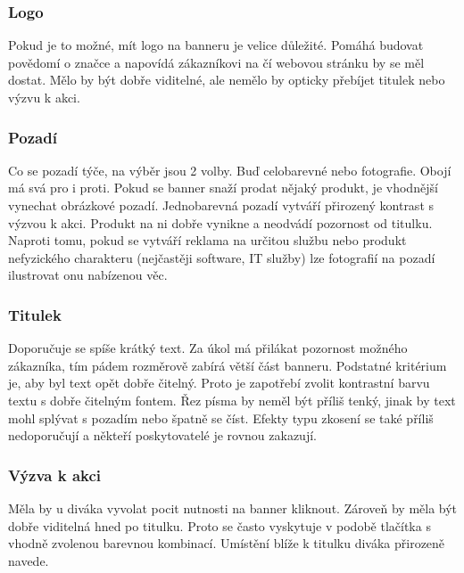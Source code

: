     \subsubsection{Logo}
    Pokud je to možné, mít logo na banneru je velice důležité. Pomáhá budovat povědomí o značce a napovídá zákazníkovi na čí webovou stránku by se měl dostat.
    Mělo by být dobře viditelné, ale nemělo by opticky přebíjet titulek nebo výzvu k akci.

    \subsubsection{Pozadí}
    Co se pozadí týče, na výběr jsou 2 volby. Buď celobarevné nebo fotografie. Obojí má svá pro i proti. Pokud se banner snaží prodat nějaký produkt,
    je vhodnější vynechat obrázkové pozadí. Jednobarevná pozadí vytváří přirozený kontrast s výzvou k akci.
    Produkt na ni dobře vynikne a neodvádí pozornost od titulku. Naproti tomu, pokud se vytváří reklama na určitou službu nebo
    produkt nefyzického charakteru (nejčastěji software, IT služby) lze fotografií na pozadí ilustrovat onu nabízenou věc. 

    \subsubsection{Titulek}
    Doporučuje se spíše krátký text. Za úkol má přilákat pozornost možného zákazníka, tím pádem rozměrově zabírá větší část banneru.
    Podstatné kritérium je, aby byl text opět dobře čitelný. Proto je zapotřebí zvolit kontrastní barvu textu s dobře čitelným fontem.
    Řez písma by neměl být příliš tenký, jinak by text mohl splývat s pozadím nebo špatně se číst. Efekty typu zkosení se také příliš nedoporučují a
    někteří poskytovatelé je rovnou zakazují. 

    \subsubsection{Výzva k akci}
    Měla by u diváka vyvolat pocit nutnosti na banner kliknout. Zároveň by měla být dobře viditelná hned po titulku.
    Proto se často vyskytuje v podobě tlačítka s vhodně zvolenou barevnou kombinací.
    Umístění blíže k titulku diváka přirozeně navede.


\endinput